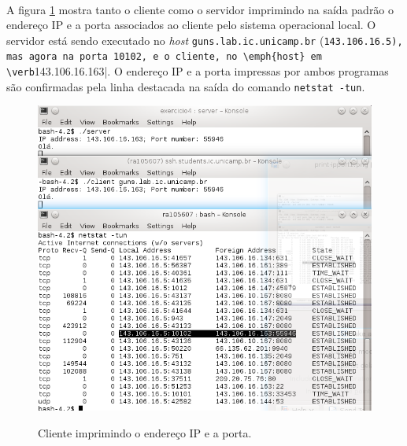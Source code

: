 \documentclass[a4paper,10pt,oneside,final,titlepage,onecolumn]{article}
\begin{document}
\paragraph{}A figura \ref{print-ipport-server} mostra tanto o cliente como o servidor imprimindo na saída padrão o endereço IP e a porta associados ao cliente pelo sistema operacional local. O servidor está sendo executado no \emph{host} \verb|guns.lab.ic.unicamp.br| (\verb|143.106.16.5), mas agora na porta 10102, e o cliente, no \emph{host} em \verb|143.106.16.163|. O endereço IP e a porta impressas por ambos programas são confirmadas pela linha destacada na saída do comando \verb|netstat -tun|.
\begin{figure}[!ht]
  \caption{Cliente imprimindo o endereço IP e a porta.}
  \centering
  \includegraphics[width=117mm]{images/print-ipport-server.png}
  \label{print-ipport-server}
\end{figure}



\FloatBarrier
\section{}
\end{document}
